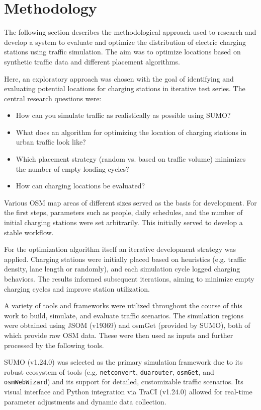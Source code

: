 \section{Methodology}
The following section describes the methodological approach used to research and develop a system to evaluate and optimize the distribution of electric charging stations using traffic simulation. The aim was to optimize locations based on synthetic traffic data and different placement algorithms.

Here, an exploratory approach was chosen with the goal of identifying and evaluating potential locations for charging stations in iterative test series. The central research questions were:
\begin{itemize}
    \item How can you simulate traffic as realistically as possible using SUMO?
    \item What does an algorithm for optimizing the location of charging stations in urban traffic look like?
    \item Which placement strategy (random vs. based on traffic volume) minimizes the number of empty loading cycles?
    \item How can charging locations be evaluated?
\end{itemize}

Various OSM map areas of different sizes served as the basis for development. For the first steps, parameters such as people, daily schedules, and the number of initial charging stations were set arbitrarily. This initially served to develop a stable workflow.

For the optimization algorithm itself an iterative development strategy was applied. Charging stations were initially placed based on heuristics (e.g. traffic density, lane length or randomly), and each simulation cycle logged charging behaviors. The results informed subsequent iterations, aiming to minimize empty charging cycles and improve station utilization.

A variety of tools and frameworks were utilized throughout the course of this work to build, simulate, and evaluate traffic scenarios. The simulation regions were obtained using JSOM (v19369) and osmGet (provided by SUMO), both of which provide raw OSM data. These were then used as inputs and further processed by the following tools.

SUMO (v1.24.0) was selected as the primary simulation framework due to its robust ecosystem of tools (e.g. \texttt{netconvert}, \texttt{duarouter}, \texttt{osmGet}, and \texttt{osmWebWizard}) and its support for detailed, customizable  traffic scenarios. Its visual interface and Python integration via TraCI (v1.24.0) allowed for real-time parameter adjustments and dynamic data collection.

